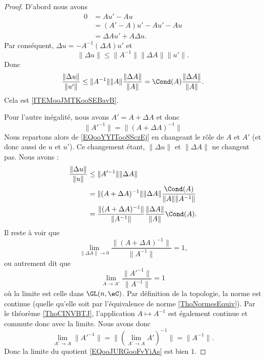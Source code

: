 \begin{proof}
    D'abord nous avons
    \begin{subequations}
        \begin{align}
            0&=Au'-Au\\
            &=(A'-A)u'-Au'-Au\\
            &=\Delta Au'+A\Delta u.
        \end{align}
    \end{subequations}
    Par conséquent, \( \Delta u=-A^{-1}(\Delta A)u'\) et
    \begin{equation}        \label{EQooYYITooSSczEj}
        \| \Delta u \|\leq \| A^{-1} \|\| \Delta A \|\| u' \|.
    \end{equation}
    Donc
    \begin{equation}
        \frac{ \| \Delta u \| }{ \| u' \| }\leq   \| A^{-1} \|\| A \|\frac{ \| \Delta A \| }{ \| A \| }   =\Cond(A)\frac{ \| \Delta A \| }{ \| A \| }.
    \end{equation}
    Cela est \ref{ITEMooJMTKooSEBavB}.

    Pour l'autre inégalité, nous avons \( A'=A+\Delta A\) et donc
    \begin{equation}
        \| A'^{-1} \|=\| (A+\Delta A)^{-1} \|
    \end{equation}
    Nous repartons alors de \eqref{EQooYYITooSSczEj} en changeant le rôle de \( A\) et \( A'\) (et donc aussi de \( u\) et \( u'\)). Ce changement étant, \( \| \Delta u \|\) et \( \| \Delta A \|\) ne changent pas. Nous avons :
    \begin{subequations}
        \begin{align}
            \frac{ \| \Delta u \| }{ \| u \| }&\leq \| A'^{-1} \|\| \Delta A \|\\
            &=\| (A+\Delta A)^{-1} \|\| \Delta A \|\frac{ \Cond(A) }{ \| A \|\| A^{-1} \| }\\
            &=\frac{ \| (A+\Delta A)^{-1} \| }{ \| A^{-1} \| }\frac{ \| \Delta A \| }{ \| A \| }\Cond(A).
        \end{align}
    \end{subequations}
    Il reste à voir que
    \begin{equation}
        \lim_{\| \Delta A \|\to 0} \frac{ \| (A+\Delta A)^{-1} \| }{ \| A^{-1} \| }=1,
    \end{equation}
    ou autrement dit que
    \begin{equation}        \label{EQooJURGooFvYiAs}
        \lim_{A\to A'} \frac{ \| A'^{-1} \| }{ \| A^{-1} \| }=1
    \end{equation}
    où la limite est celle dans \( \GL(n,\eC)\). Par définition de la topologie, la norme est continue (quelle qu'elle soit par l'équivalence de norme \ref{ThoNormesEquiv}). Par le théorème \ref{ThoCINVBTJ}, l'application \( A\mapsto A^{-1}\) est également continue et commute donc avec la limite. Nous avons donc
    \begin{equation}
        \lim_{A'\to A}\| A'^{-1} \|=\| (\lim_{A'\to A} A')^{-1} \|=\| A^{-1} \|.
    \end{equation}
    Donc la limite du quotient \eqref{EQooJURGooFvYiAs} est bien \( 1\).
\end{proof}

